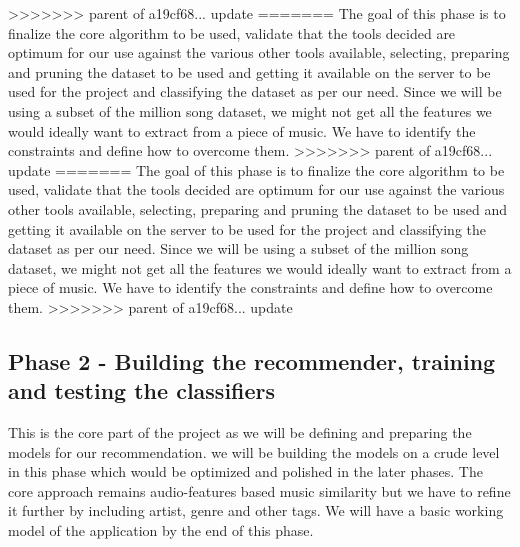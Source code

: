 \documentclass{article}
\begin{document}
>>>>>>> parent of a19cf68... update
=======
The goal of this phase is to finalize the core algorithm to be used, validate that the tools decided are optimum for our use against the various other tools available, selecting, preparing and pruning the dataset to be used and getting it available on the server to be used for the project and classifying the dataset as per our need. Since we will be using a subset of the million song dataset, we might not get all the features we would ideally want to extract from a piece of music. We have to identify the constraints and define how to overcome them.
>>>>>>> parent of a19cf68... update
=======
The goal of this phase is to finalize the core algorithm to be used, validate that the tools decided are optimum for our use against the various other tools available, selecting, preparing and pruning the dataset to be used and getting it available on the server to be used for the project and classifying the dataset as per our need. Since we will be using a subset of the million song dataset, we might not get all the features we would ideally want to extract from a piece of music. We have to identify the constraints and define how to overcome them.
>>>>>>> parent of a19cf68... update

\subsection{Phase 2 - Building the recommender, training and testing the classifiers}
This is the core part of the project as we will be defining and preparing the models for our recommendation. we will be building the models on a crude level in this phase which would be optimized and polished in the later phases. The core approach remains audio-features based music similarity but we have to refine it further by including artist, genre and other tags. We will have a basic working model of the application by the end of this phase.
\end{document}
